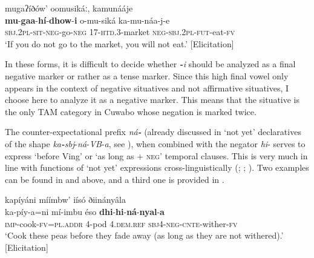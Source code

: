 \documentclass[output=paper,colorlinks=true, citecolor=brown,draftmode]{langscibook}
\begin{document}
\ea\label{ex:cuw:41} mugaʔíðów’ oomusikáː, kamunááje \\ 
    \gll  \textbf{mu}{}-\textbf{gaa}{}-\textbf{hí}{}-\textbf{dhow}{}-\textbf{i} o-mu-siká ka-mu-náa-j-e \\
        \textsc{sbj.2pl}{}-\textsc{sit-neg}{}-go\textsc{{}-neg} 17-\textsc{htd.3}{}-market \textsc{neg-sbj.2pl-fut}{}-eat-\textsc{fv} \\
    \glt ‘If you do not go to the market, you will not eat.’ [Elicitation]
\z 

In these forms, it is difficult to decide whether \textbf{\textit{{}-}}\textit{i} should be analyzed as a final negative marker or rather as a tense marker. Since this high final vowel only appears in the context of negative situatives and not affirmative situatives, I choose here to analyze it as a negative marker. This means that the situative is the only TAM category in Cuwabo whose negation is marked twice.

The counter-expectational prefix \textit{ná}\textbf{\textit{{}-}} (already discussed in ‘not yet’ declaratives of the shape \textit{ka}\textbf{\textit{{}-}}\textit{sbj}{}-\textit{ná}{}-\textit{VB}{}-\textit{a}, see ), when combined with the negator \textit{hi}{}- serves to express ‘before Ving’ or ‘as long as + \textsc{neg}’ temporal clauses. This is very much in line with functions of ‘not yet’ expressions cross-linguistically (\citealt{Baar1997}; \citealt{Auwera1998}; \citealt{Plungian1999}). Two examples can be found in  and  above, and a third one is provided in .

\ea\label{ex:cuw:42} kapíyáni míímbw’ iísó ðiinányâla \\ 
    \gll  ka-píy-a=ni mí-imbu éso \textbf{dhi}{}-\textbf{hi}{}-\textbf{ná}{}-\textbf{nyal}{}-\textbf{a} \\
        \textsc{imp}{}-cook-\textsc{fv}=\textsc{pl.addr} 4-pod 4.\textsc{dem.ref} \textsc{sbj}4-\textsc{neg-cnte}{}-wither-\textsc{fv} \\
    \glt ‘Cook these peas before they fade away (as long as they are not withered).’ [Elicitation]
\z 
\end{document}
